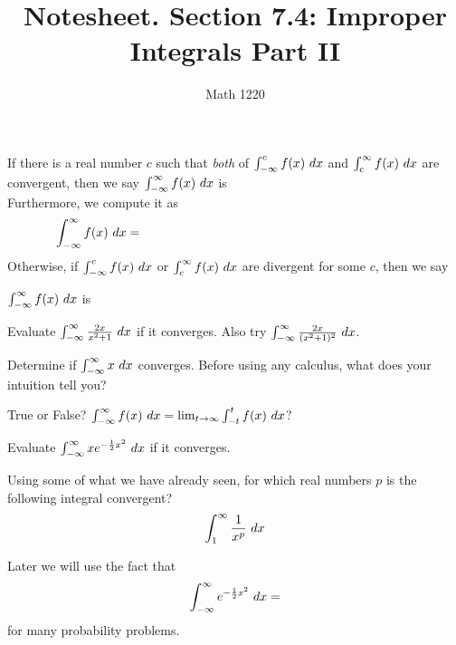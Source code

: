 \documentclass[12pt, a4paper]{article}
\author{Math 1220}
\title{Notesheet. Section 7.4: Improper Integrals Part II}
\date{}
\begin{document}
\maketitle
\nameline
\begin{defi}
  If there is a real number \(c\) such that \emph{both} of
  \(\int_{-\infty}^c f(x) \ d x\) and \(\int_c^{\infty} f(x) \ d x\) are
  convergent, then we say \(\int_{-\infty}^\infty f(x) \ d x\) is \\

  Furthermore, we compute it as \[
    \int_{-\infty}^\infty f(x) \dx = \hspace{3in}
  \]
  Otherwise, if \(\int_{-\infty}^c f(x)\ d x\) or \(\int_c^\infty f(x)
  \ d x\) are divergent for some \(c\), then we say
  
  \(\int_{-\infty}^\infty f(x) \ d x\) is
\end{defi}
\begin{ex}
  Evaluate \(\int_{-\infty}^\infty \frac{2x}{x^2+1} \ d x\) if it
  converges. Also try \(\int_{-\infty}^\infty \frac{2x}{(x^2+1)^2} \ d x\).
\end{ex}
\begin{ex}
  Determine if \(\int_{-\infty}^\infty x \ d x\) converges. Before using
  any calculus, what does your intuition tell you?
\end{ex}
\begin{ex}
  True or False? \(\int_{-\infty}^\infty f(x) \ d x = \lim_{t \to
    \infty} \int_{-t}^t f(x)\ d x\)?
\end{ex}
\begin{ex}
  Evaluate \(\int_{-\infty}^\infty x e^{-\frac{1}{2}x^2} \ d x\) if it
  converges. 
\end{ex}
\begin{ex}
  Using some of what we have already seen, for which real numbers
  \(p\) is the following integral convergent? \[
    \int_1^\infty \frac{1}{x^p} \ d x
  \]
\end{ex}
\begin{rmk}
  Later we will use the fact that \[
    \int_{-\infty}^\infty e^{-\frac{1}{2}x^2} \ d x = 
  \]
  for many probability problems.
\end{rmk}
\end{document}
